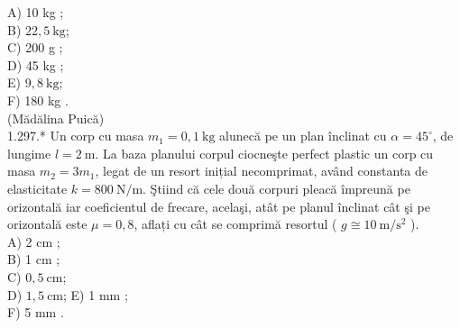 \documentclass[10pt]{article}
\begin{document}
A) 10 kg ;\\
B) $22,5 \mathrm{~kg}$;\\
C) 200 g ;\\
D) 45 kg ;\\
E) $9,8 \mathrm{~kg}$;\\
F) 180 kg .\\
(Mădălina Puică)\\
1.297.* Un corp cu masa $m_{1}=0,1 \mathrm{~kg}$ alunecă pe un plan înclinat cu $\alpha=45^{\circ}$, de lungime $l=2 \mathrm{~m}$. La baza planului corpul ciocneşte perfect plastic un corp cu masa $m_{2}=3 m_{1}$, legat de un resort inițial necomprimat, având constanta de elasticitate $k=800 \mathrm{~N} / \mathrm{m}$. Ştiind că cele două corpuri pleacă împreună pe orizontală iar coeficientul de frecare, acelaşi, atât pe planul înclinat cât şi pe orizontală este $\mu=0,8$, aflați cu cât se comprimă resortul ( $g \cong 10 \mathrm{~m} / \mathrm{s}^{2}$ ).\\
A) 2 cm ;\\
B) 1 cm ;\\
C) $0,5 \mathrm{~cm}$;\\
D) $1,5 \mathrm{~cm}$; E) 1 mm ;\\
F) 5 mm .
\end{document}
